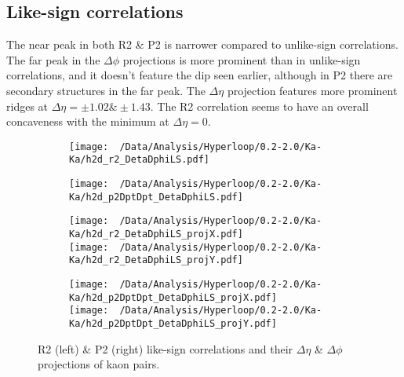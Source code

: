 \documentclass[12pt,a4paper,twoside]{report}
\begin{document}
\subsection{Like-sign correlations}
The near peak in both R2 \& P2 is narrower compared to unlike-sign correlations. The far peak in the $\Delta\phi$ projections is more prominent than in unlike-sign correlations, and it doesn't feature the dip seen earlier, although in P2 there are secondary structures in the far peak. The $\Delta\eta$ projection features more prominent ridges at $\Delta\eta=\pm1.02\&\pm1.43$. The R2 correlation seems to have an overall concaveness with the minimum at $\Delta\eta=0$.
\begin{figure}[H]
	\begin{subfigure}{0.49\linewidth}
		\texttt{[image: ~/Data/Analysis/Hyperloop/0.2-2.0/Ka-Ka/h2d\_r2\_DetaDphiLS.pdf]}\\
	\end{subfigure}
	\begin{subfigure}{0.49\linewidth}
		\texttt{[image: ~/Data/Analysis/Hyperloop/0.2-2.0/Ka-Ka/h2d\_p2DptDpt\_DetaDphiLS.pdf]}\\
	\end{subfigure}
\end{figure}
\begin{figure}[H]
	\ContinuedFloat
	\begin{subfigure}{0.49\linewidth}
		\texttt{[image: ~/Data/Analysis/Hyperloop/0.2-2.0/Ka-Ka/h2d\_r2\_DetaDphiLS\_projX.pdf]}\\
		\texttt{[image: ~/Data/Analysis/Hyperloop/0.2-2.0/Ka-Ka/h2d\_r2\_DetaDphiLS\_projY.pdf]}\\
	\end{subfigure}
	\begin{subfigure}{0.49\linewidth}
		\texttt{[image: ~/Data/Analysis/Hyperloop/0.2-2.0/Ka-Ka/h2d\_p2DptDpt\_DetaDphiLS\_projX.pdf]}\\
		\texttt{[image: ~/Data/Analysis/Hyperloop/0.2-2.0/Ka-Ka/h2d\_p2DptDpt\_DetaDphiLS\_projY.pdf]}\\
	\end{subfigure}
	\caption{R2 (left) \& P2 (right) like-sign correlations and their $\Delta\eta$ \& $\Delta\phi$ projections of kaon pairs.}
\end{figure}
\end{document}
